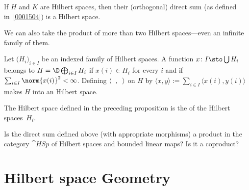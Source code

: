 \begin{prop} If $H$ and $K$ are Hilbert spaces, then their (orthogonal) direct sum (as defined in~\ref{0001504})
is a Hilbert space.
\end{prop}

We can also take the product of more than two Hilbert spaces---even an infinite family of them.

\begin{prop} Let $\bigl(H_i\bigr)_{i \in I}$ be an indexed family of Hilbert spaces.  A function $x\colon I \sto \bigcup H_i$
belongs to $H = \D\bigoplus_{i \in I}H_i$ if $x(i) \in H_i$ for every $i$ and if $\sum_{i \in I}\norm{x(i)}^2 < \infty$.
Defining $\langle \hphantom x, \hphantom y \rangle$ on $H$ by $\langle x, y \rangle := \sum_{i \in I} \langle
x(i), y(i) \rangle$ makes $H$ into an Hilbert space.
\end{prop}

\begin{defn} The Hilbert space defined in the preceding proposition is the
 of the Hilbert spaces~$H_i$.
\end{defn}

\begin{exer}  Is the direct sum defined above (with appropriate morphisms) a product in the category $\cat{HSp}$
of Hilbert spaces and bounded linear maps?  Is it a coproduct?
\end{exer}


























\section{Hilbert space Geometry}

